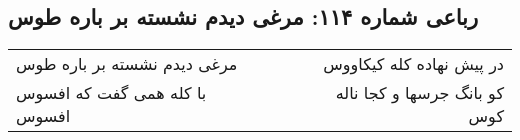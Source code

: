 \begin{center}
\section*{رباعی شماره ۱۱۴: مرغی دیدم نشسته بر باره طوس}
\label{sec:sh114}
\begin{longtable}{l p{0.5cm} r}
مرغی دیدم نشسته بر باره طوس
&&
در پیش نهاده کله کیکاووس
\\
با کله همی گفت که افسوس افسوس
&&
کو بانگ جرسها و کجا ناله کوس
\\
\end{longtable}
\end{center}
